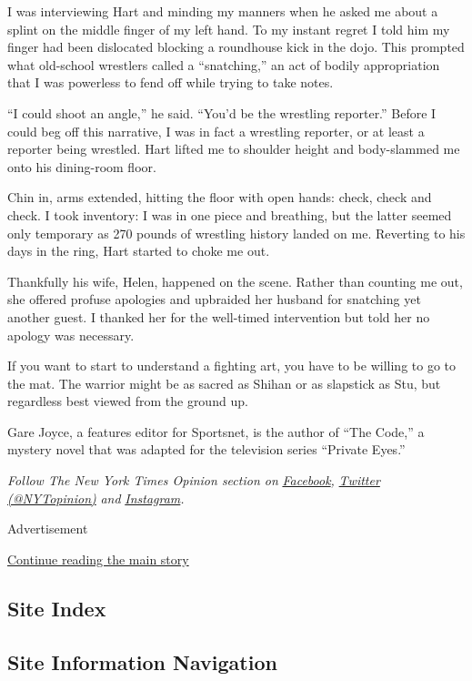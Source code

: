 I was interviewing Hart and minding my manners when he asked me about a
splint on the middle finger of my left hand. To my instant regret I told
him my finger had been dislocated blocking a roundhouse kick in the
dojo. This prompted what old-school wrestlers called a ``snatching,'' an
act of bodily appropriation that I was powerless to fend off while
trying to take notes.

``I could shoot an angle,'' he said. ``You'd be the wrestling
reporter.'' Before I could beg off this narrative, I was in fact a
wrestling reporter, or at least a reporter being wrestled. Hart lifted
me to shoulder height and body-slammed me onto his dining-room floor.

Chin in, arms extended, hitting the floor with open hands: check, check
and check. I took inventory: I was in one piece and breathing, but the
latter seemed only temporary as 270 pounds of wrestling history landed
on me. Reverting to his days in the ring, Hart started to choke me out.

Thankfully his wife, Helen, happened on the scene. Rather than counting
me out, she offered profuse apologies and upbraided her husband for
snatching yet another guest. I thanked her for the well-timed
intervention but told her no apology was necessary.

If you want to start to understand a fighting art, you have to be
willing to go to the mat. The warrior might be as sacred as Shihan or as
slapstick as Stu, but regardless best viewed from the ground up.

Gare Joyce, a features editor for Sportsnet, is the author of ``The
Code,'' a mystery novel that was adapted for the television series
``Private Eyes.''

\emph{Follow The New York Times Opinion section on}
\href{https://www.facebookcorewwwi.onion/nytopinion}{\emph{Facebook}}\emph{,}
\href{http://twitter.com/NYTOpinion}{\emph{Twitter (@NYTopinion)}}
\emph{and}
\href{https://www.instagram.com/nytopinion/}{\emph{Instagram}}\emph{.}

Advertisement

\protect\hyperlink{after-bottom}{Continue reading the main story}

\hypertarget{site-index}{%
\subsection{Site Index}\label{site-index}}

\hypertarget{site-information-navigation}{%
\subsection{Site Information
Navigation}\label{site-information-navigation}}

